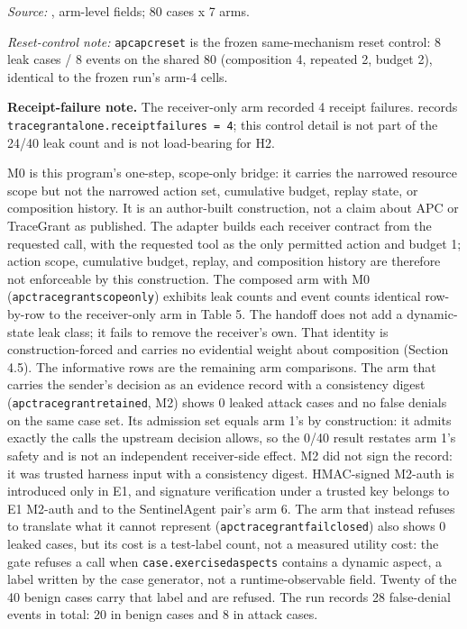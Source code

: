 \documentclass[
  10pt,
]{article}
\let\origtexttt\texttt
\renewcommand{\texttt}[1]{{\upshape\origtexttt{#1}}}
\renewcommand{\_}{\allowbreak\origunderscore}
\begin{document}
\emph{Source:} , arm-level
fields; 80 cases x 7 arms.

\emph{Reset-control note:} \texttt{apc\_apc\_reset} is the frozen
same-mechanism reset control: 8 leak cases / 8 events on the shared 80
(composition 4, repeated 2, budget 2), identical to the frozen run's
arm-4 cells.

\textbf{Receipt-failure note.} The receiver-only arm recorded 4 receipt
failures.  records
\texttt{tracegrant\_alone.receipt\_failures\ =\ 4}; this control detail
is not part of the 24/40 leak count and is not load-bearing for H2.

M0 is this program's one-step, scope-only bridge: it carries the
narrowed resource scope but not the narrowed action set, cumulative
budget, replay state, or composition history. It is an author-built
construction, not a claim about APC or TraceGrant as published. The
adapter builds each receiver contract from the requested call, with the
requested tool as the only permitted action and budget 1; action scope,
cumulative budget, replay, and composition history are therefore not
enforceable by this construction. The composed arm with M0
(\texttt{apc\_tracegrant\_scope\_only}) exhibits leak counts and event
counts identical row-by-row to the receiver-only arm in Table 5. The
handoff does not add a dynamic-state leak class; it fails to remove the
receiver's own. That identity is construction-forced and carries no
evidential weight about composition (Section 4.5). The informative rows
are the remaining arm comparisons. The arm that carries the sender's
decision as an evidence record with a consistency digest
(\texttt{apc\_tracegrant\_retained}, M2) shows 0 leaked attack cases and
no false denials on the same case set. Its admission set equals arm 1's
by construction: it admits exactly the calls the upstream decision
allows, so the 0/40 result restates arm 1's safety and is not an
independent receiver-side effect. M2 did not sign the record: it was
trusted harness input with a consistency digest. HMAC-signed M2-auth is
introduced only in E1, and signature verification under a trusted key
belongs to E1 M2-auth and to the SentinelAgent pair's arm 6. The arm
that instead refuses to translate what it cannot represent
(\texttt{apc\_tracegrant\_fail\_closed}) also shows 0 leaked cases, but
its cost is a test-label count, not a measured utility cost: the gate
refuses a call when \texttt{case.exercised\_aspects} contains a dynamic
aspect, a label written by the case generator, not a runtime-observable
field. Twenty of the 40 benign cases carry that label and are refused.
The run records 28 false-denial events in total: 20 in benign cases and
8 in attack cases.
\end{document}
